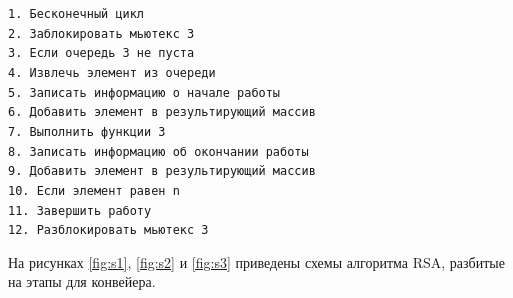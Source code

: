 \documentclass[a4paper,12pt]{article}
\begin{document}
\begin{flushleft}
\texttt{1. Бесконечный цикл\\
2. \hspace{1.5cm} Заблокировать мьютекс 3\\
3. \hspace{1.5cm} Если очередь 3 не пуста\\
4. \hspace{3cm} Извлечь элемент из очереди\\
5. \hspace{3cm} Записать информацию о начале работы\\
6. \hspace{3cm} Добавить элемент в результирующий массив\\
7. \hspace{3cm} Выполнить функции 3\\
8. \hspace{3cm} Записать информацию об окончании работы\\
9. \hspace{3cm} Добавить элемент в результирующий массив\\
10. \hspace{3cm} Если элемент равен n\\
11. \hspace{4.5cm} Завершить работу\\
12. \hspace{1.5cm} Разблокировать мьютекс 3\\
}
\end{flushleft}
\newpage
На рисунках \ref{fig:s1}, \ref{fig:s2} и \ref{fig:s3}  приведены схемы алгоритма RSA, разбитые на этапы для конвейера.
\end{document}
